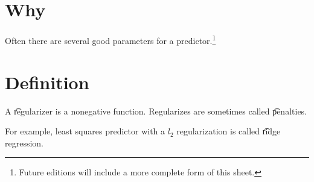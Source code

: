 

\section*{Why}

Often there are several good parameters for a predictor.\footnote{Future editions will include a more complete form of this sheet.}

\section*{Definition}

A \t{regularizer} is a nonegative function.
Regularizes are sometimes called \t{penalties}.

For example, least squares predictor with a $l_2$ regularization is called \t{ridge regression}.

\blankpage